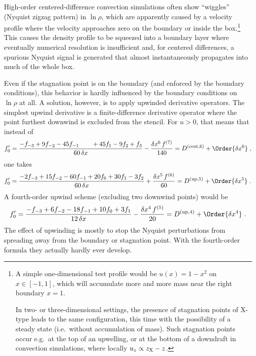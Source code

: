 \documentclass[\mydriver,12pt,twoside,notitlepage,a4paper]{article}
\begin{document}
High-order centered-difference convection simulations often show
``wiggles'' (Nyquist zigzag pattern) in $\ln\rho$, which are apparently
caused by a velocity profile where the velocity approaches zero on the
boundary or inside the box.\footnote{%
  A simple one-dimensional test profile would be $u(x) = 1-x^2$ on $x \in
  [-1,1]$, which will accumulate more and more mass near the right
  boundary $x=1$.

  In two- or three-dimensional settings, the presence of stagnation points
  of X-type leads to the same configuration, this time with the
  possibility of a steady state (i.e.~without accumulation of mass).
  Such stagnation points occur e.g.~at the top of an upwelling, or at
  the bottom of a downdraft in convection simulations, where locally
  $u_z \propto z_{\rm X}-z$.
}
This causes the density profile to be squeezed into a boundary layer where
eventually numerical resolution is insufficient and, for centered
differences, a spurious Nyquist signal is generated that almost
instantaneously propagates into much of the whole box.

Even if the stagnation point is on the boundary (and enforced by the
boundary conditions), this behavior is hardly influenced by the boundary
conditions on $\ln\rho$ at all.
A solution, however, is to apply upwinded derivative operators.
The simplest upwind derivative is a finite-difference derivative operator
where the point furthest downwind is excluded from the stencil.
For $u>0$, that means that instead of
\begin{equation}
  f'_0
  = \frac{-f_{-3} + 9 f_{-2} - 45 f_{-1} \qquad
           + 45 f_{1} - 9 f_{2} + f_{3}}
         {60\,\delta x}
    - \frac{\delta x^6\,f^{(7)}}{140}
  = D^{\rm(cent,6)} + \Order{\delta x^6} \; ,
\end{equation}
one takes
\begin{equation}
  f'_0
  = \frac{-2 f_{-3} + 15 f_{-2} - 60 f_{-1} + 20 f_{0} + 30 f_{1} - 3 f_{2}}
         {60\,\delta x}
    + \frac{\delta x^5\,f^{(6)}}{60}
  = D^{\rm(up,5)} + \Order{\delta x^5} \; .
\end{equation}
A fourth-order upwind scheme (excluding two downwind points) would be
\begin{equation}
  f'_0
  = \frac{-f_{-3} + 6 f_{-2} - 18 f_{-1} + 10 f_{0} + 3 f_{1}}
         {12\,\delta x}
    - \frac{\delta x^4\,f^{(5)}}{20}
  = D^{\rm(up,4)} + \Order{\delta x^4} \; .
\end{equation}
The effect of upwinding is mostly to stop the Nyquist perturbations from
spreading away from the boundary or stagnation point.
With the fourth-order formula they actually hardly ever develop.
\end{document}
